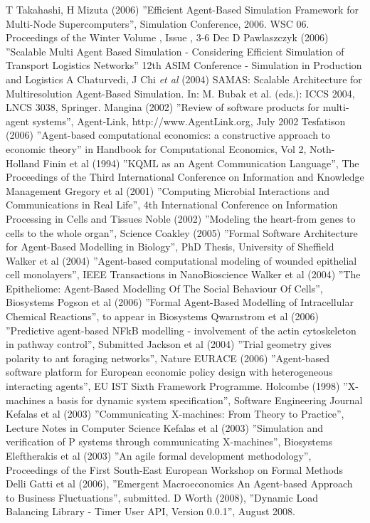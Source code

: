
\begin{thebibliography}{99}
 T Takahashi, H Mizuta (2006) ''Efficient Agent-Based Simulation Framework for Multi-Node Supercomputers'', Simulation Conference, 2006. WSC 06. Proceedings of the Winter Volume , Issue , 3-6 Dec
 D Pawlaszczyk (2006) ''Scalable Multi Agent Based Simulation - Considering Efficient Simulation of Transport Logistics Networks'' 12th ASIM Conference - Simulation in Production and Logistics
  A Chaturvedi, J Chi \textsl{et al} (2004) SAMAS: Scalable Architecture for Multiresolution Agent-Based Simulation. In: M. Bubak et al. (eds.): ICCS 2004,
LNCS 3038, Springer.
 Mangina (2002) ''Review of software products for multi-agent systems'', Agent-Link, http://www.AgentLink.org, July 2002
 Tesfatison (2006) ''Agent-based computational economics: a constructive approach to economic theory'' in Handbook for Computational Economics, Vol 2, Noth-Holland
 Finin et al (1994) ''KQML as an Agent Communication Language'', The Proceedings of  the Third International Conference on Information and Knowledge Management
 Gregory et al (2001)  ''Computing Microbial Interactions and Communications in Real Life'', 4th International Conference on Information Processing in Cells and Tissues
 Noble (2002)  ''Modeling the heart-from genes to cells to the whole organ'', Science
 Coakley  (2005) ''Formal Software Architecture for Agent-Based Modelling in Biology'', PhD Thesis, University of Sheffield
 Walker et al (2004) ''Agent-based computational modeling of wounded epithelial cell monolayers'', IEEE Transactions in NanoBioscience
 Walker et al (2004) ''The Epitheliome: Agent-Based Modelling Of The Social Behaviour Of Cells'', Biosystems
 Pogson  et al (2006) ''Formal Agent-Based Modelling of Intracellular Chemical Reactions'', to appear in Biosystems
 Qwarnstrom et al (2006) ''Predictive agent-based NFkB modelling - involvement of the actin cytoskeleton in pathway control'', Submitted
 Jackson et al (2004) ''Trial geometry gives polarity to ant foraging networks'', Nature
 EURACE (2006)  ''Agent-based software platform for European economic policy design with heterogeneous interacting agents'', EU IST Sixth Framework Programme.
 Holcombe (1998) ''X-machines a basis for dynamic system specification'', Software Engineering Journal
 Kefalas et al (2003) ''Communicating X-machines: From Theory to Practice'', Lecture Notes in Computer Science
 Kefalas et al (2003) ''Simulation and verification of P systems through communicating X-machines'', Biosystems
 Eleftherakis et al (2003) ''An agile formal development methodology'', Proceedings of the First South-East European Workshop on Formal Methods
 Delli Gatti et al (2006), ''Emergent Macroeconomics An Agent-based Approach to Business Fluctuations'', submitted.
 D Worth (2008), ''Dynamic Load Balancing Library - Timer User API, Version 0.0.1'', August 2008.
\end{thebibliography}
